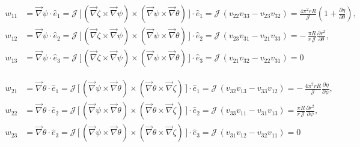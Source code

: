 \documentclass[10pt,a4paper]{article}
\numberwithin{equation}{section}
\begin{document}
\begin{equation}
    \begin{aligned}
    w_{11}
    &= \vec\nabla\psi \cdot \hat e_1
    = \mathcal{J}\,\Big[\,(\vec\nabla\zeta \times \vec\nabla\psi)\times(\vec\nabla\psi \times \vec\nabla\theta)\,\Big]\!\cdot\hat e_1
    = \mathcal{J}\,(v_{22}v_{33}-v_{23}v_{32})
    = \frac{4\pi^{2} r R}{\mathcal{J}}\left(1+\frac{\partial \eta}{\partial \theta}\right), \\[6pt]
    w_{12}
    &= \vec\nabla\psi \cdot \hat e_2
    = \mathcal{J}\,\Big[\,(\vec\nabla\zeta \times \vec\nabla\psi)\times(\vec\nabla\psi \times \vec\nabla\theta)\,\Big]\!\cdot\hat e_2
    = \mathcal{J}\,(v_{23}v_{31}-v_{21}v_{33})
    = -\,\frac{\pi R}{r\,\mathcal{J}}\frac{\partial r^{2}}{\partial \theta}, \\[6pt]
    w_{13}
    &= \vec\nabla\psi \cdot \hat e_3
    = \mathcal{J}\,\Big[\,(\vec\nabla\zeta \times \vec\nabla\psi)\times(\vec\nabla\psi \times \vec\nabla\theta)\,\Big]\!\cdot\hat e_3
    = \mathcal{J}\,(v_{21}v_{32}-v_{22}v_{31})
    = 0
    \end{aligned}
\end{equation}

\begin{equation}
    \begin{aligned}
    w_{21}
    &= \vec\nabla\theta \cdot \hat e_1
    = \mathcal{J}\,\Big[\,(\vec\nabla\psi \times \vec\nabla\theta)\times(\vec\nabla\theta \times \vec\nabla\zeta)\,\Big]\!\cdot\hat e_1
    = \mathcal{J}\,(v_{32}v_{13}-v_{33}v_{12})
    = -\,\frac{4\pi^{2} r R}{\mathcal{J}}\frac{\partial \eta}{\partial \psi}, \\[6pt]
    w_{22}
    &= \vec\nabla\theta \cdot \hat e_2
    = \mathcal{J}\,\Big[\,(\vec\nabla\psi \times \vec\nabla\theta)\times(\vec\nabla\theta \times \vec\nabla\zeta)\,\Big]\!\cdot\hat e_2
    = \mathcal{J}\,(v_{33}v_{11}-v_{31}v_{13})
    = \frac{\pi R}{r\,\mathcal{J}}\frac{\partial r^{2}}{\partial \psi}, \\[6pt]
    w_{23}
    &= \vec\nabla\theta \cdot \hat e_3
    = \mathcal{J}\,\Big[\,(\vec\nabla\psi \times \vec\nabla\theta)\times(\vec\nabla\theta \times \vec\nabla\zeta)\,\Big]\!\cdot\hat e_3
    = \mathcal{J}\,(v_{31}v_{12}-v_{32}v_{11})
    = 0
    \end{aligned}
\end{equation}
\end{document}
